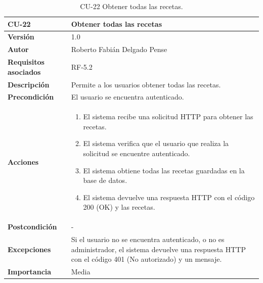 \begin{table}[p]
	\centering
	\begin{tabularx}{\linewidth}{ p{} p{} }
		\toprule
		\textbf{CU-22}    & \textbf{Obtener todas las recetas}\\
		\toprule
		\textbf{Versión}              & 1.0    \\
		\textbf{Autor}                & Roberto Fabián Delgado Pense \\
		\textbf{Requisitos asociados} & RF-5.2 \\ 
		\textbf{Descripción}          & Permite a los usuarios obtener todas las recetas. \\
		\textbf{Precondición}         & El usuario se encuentra autenticado. \\  
		\textbf{Acciones}             &
		\begin{enumerate}
			\def\labelenumi{\arabic{enumi}.}
			\tightlist
			\item El sistema recibe una solicitud HTTP para obtener las recetas.
                \item El sistema verifica que el usuario que realiza la solicitud se encuentre autenticado.
			\item El sistema obtiene todas las recetas guardadas en la base de datos.
                \item El sistema devuelve una respuesta HTTP con el código 200 (OK) y las recetas.         
            \end{enumerate}\\
		\textbf{Postcondición}        & -  \\
		\textbf{Excepciones}          &  Si el usuario no se encuentra autenticado, o no es administrador, el 
                    sistema devuelve una respuesta HTTP con el código 401 (No autorizado) y un mensaje.\\
		\textbf{Importancia}          & Media \\
		\bottomrule
	\end{tabularx}
	\caption{CU-22 Obtener todas las recetas.}
\end{table}

